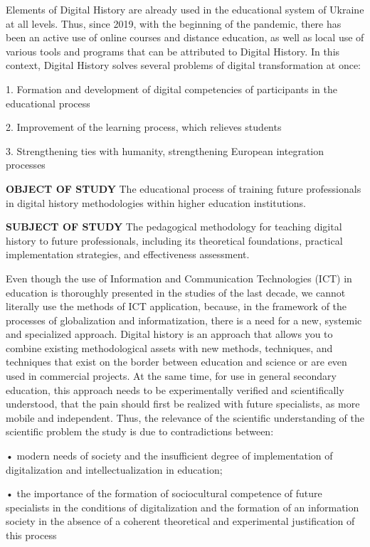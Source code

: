 {Elements of Digital History are already used in the educational system of Ukraine at all levels. Thus, since 2019, with the beginning of the pandemic, there has been an active use of online courses and distance education, as well as local use of various tools and programs that can be attributed to Digital History.
In this context, Digital History solves several problems of digital transformation at once:

1. Formation and development of digital competencies of participants in the educational process

2. Improvement of the learning process, which relieves students

3. Strengthening ties with humanity, strengthening European integration processes

\textbf{OBJECT OF STUDY}
The educational process of training future professionals in digital history methodologies within higher education institutions.

\textbf{SUBJECT OF STUDY}
The pedagogical methodology for teaching digital history to future professionals, including its theoretical foundations, practical implementation strategies, and effectiveness assessment.

Even though the use of Information and Communication Technologies (ICT) in education is thoroughly presented in the studies of the last decade, we cannot literally use the methods of ICT application, because, in the framework of the processes of globalization and informatization, there is a need for a new, systemic and specialized approach. Digital history is an approach that allows you to combine existing methodological assets with new methods, techniques, and techniques that exist on the border between education and science or are even used in commercial projects. At the same time, for use in general secondary education, this approach needs to be experimentally verified and scientifically understood, that the pain should first be realized with future specialists, as more mobile and independent.
Thus, the relevance of the scientific understanding of the scientific problem the study is due to contradictions between:

• modern needs of society and the insufficient degree of implementation of digitalization and intellectualization in education;

• the importance of the formation of sociocultural competence of future specialists in the conditions of digitalization and the formation of an information society in the absence of a coherent theoretical and experimental justification of this process

}
